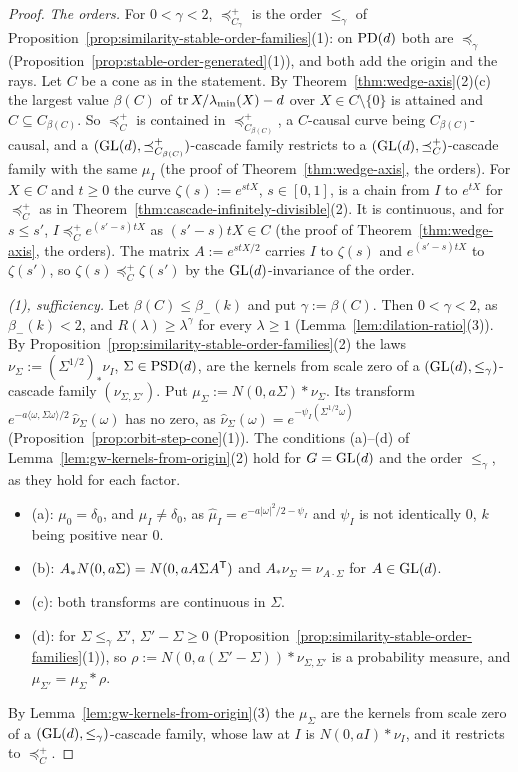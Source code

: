\begin{proof}
\emph{The orders.} For $0 < \gamma < 2$, $\preceq^+_{C_\gamma}$ is the order $\le_\gamma$ of
Proposition~\ref{prop:similarity-stable-order-families}(1): on $\mathrm{PD}(d)$ both are $\preceq_\gamma$
(Proposition~\ref{prop:stable-order-generated}(1)), and both add the origin and the rays. Let $C$ be a cone as in the
statement. By Theorem~\ref{thm:wedge-axis}(2)(c) the largest value $\beta(C)$ of $\operatorname{tr} X/\lambda_{\min}(X) - d$ over
$X \in C \setminus \{0\}$ is attained and $C \subseteq C_{\beta(C)}$. So $\preceq^+_C$ is contained in
$\preceq^+_{C_{\beta(C)}}$, a $C$-causal curve being $C_{\beta(C)}$-causal, and a
$(\mathrm{GL}(d), \preceq^+_{C_{\beta(C)}})$-cascade family restricts to a $(\mathrm{GL}(d), \preceq^+_C)$-cascade family with the
same $\mu_I$ (the proof of Theorem~\ref{thm:wedge-axis}, the orders). For $X \in C$ and $t \ge 0$ the curve
$\zeta(s) := e^{stX}$, $s \in [0,1]$, is a chain from $I$ to $e^{tX}$ for $\preceq^+_C$ as in
Theorem~\ref{thm:cascade-infinitely-divisible}(2). It is continuous, and for $s \le s'$, $I \preceq^+_C e^{(s'-s)tX}$
as $(s'-s)tX \in C$ (the proof of Theorem~\ref{thm:wedge-axis}, the orders). The matrix $A := e^{stX/2}$ carries
$I$ to $\zeta(s)$ and $e^{(s'-s)tX}$ to $\zeta(s')$, so $\zeta(s) \preceq^+_C \zeta(s')$ by the
$\mathrm{GL}(d)$-invariance of the order.

\emph{(1), sufficiency.} Let $\beta(C) \le \beta_-(k)$ and put $\gamma := \beta(C)$. Then $0 < \gamma < 2$, as
$\beta_-(k) < 2$, and $R(\lambda) \ge \lambda^\gamma$ for every $\lambda \ge 1$ (Lemma~\ref{lem:dilation-ratio}(3)). By
Proposition~\ref{prop:similarity-stable-order-families}(2) the laws $\nu_\Sigma := (\Sigma^{1/2})_*\nu_I$, $\Sigma \in \mathrm{PSD}(d)$,
are the kernels from scale zero of a $(\mathrm{GL}(d), \le_\gamma)$-cascade family $(\nu_{\Sigma,\Sigma'})$. Put
$\mu_\Sigma := N(0, a\Sigma) * \nu_\Sigma$. Its transform $e^{-a\langle\omega,\Sigma\omega\rangle/2}\,\widehat\nu_\Sigma(\omega)$
has no zero, as $\widehat\nu_\Sigma(\omega) = e^{-\psi_I(\Sigma^{1/2}\omega)}$ (Proposition~\ref{prop:orbit-step-cone}(1)). The
conditions (a)--(d) of Lemma~\ref{lem:gw-kernels-from-origin}(2) hold for $G = \mathrm{GL}(d)$ and the order $\le_\gamma$, as
they hold for each factor.
\begin{itemize}
\item (a): $\mu_0 = \delta_0$, and $\mu_I \ne \delta_0$, as $\widehat\mu_I = e^{-a|\omega|^2/2 - \psi_I}$ and $\psi_I$
is not identically $0$, $k$ being positive near $0$.
\item (b): $A_*N(0, a\Sigma) = N(0, aA\Sigma A^{\mathsf{T}})$ and $A_*\nu_\Sigma = \nu_{A\cdot\Sigma}$ for $A \in \mathrm{GL}(d)$.
\item (c): both transforms are continuous in $\Sigma$.
\item (d): for $\Sigma \le_\gamma \Sigma'$, $\Sigma' - \Sigma \ge 0$ (Proposition~\ref{prop:similarity-stable-order-families}(1)), so
$\rho := N(0, a(\Sigma' - \Sigma)) * \nu_{\Sigma,\Sigma'}$ is a probability measure, and $\mu_{\Sigma'} = \mu_\Sigma * \rho$.
\end{itemize}
By Lemma~\ref{lem:gw-kernels-from-origin}(3) the $\mu_\Sigma$ are the kernels from scale zero of a
$(\mathrm{GL}(d), \le_\gamma)$-cascade family, whose law at $I$ is $N(0, aI) * \nu_I$, and it restricts to $\preceq^+_C$.


\end{proof}
